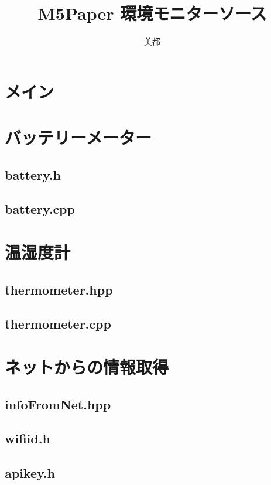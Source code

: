 \documentclass[a4paper, 10pt]{ltjsarticle}
\title{M5Paper 環境モニターソース}
\author{美都}
\begin{document}
\maketitle
\tableofcontents
\clearpage

\section {メイン}

\clearpage
\section {バッテリーメーター}
\subsection {battery.h}

\subsection {battery.cpp}

\clearpage

\section{温湿度計}
\subsection{thermometer.hpp}

\subsection{thermometer.cpp}

\clearpage

\section{ネットからの情報取得}
\subsection{infoFromNet.hpp}

\subsection{wifiid.h}

\subsection{apikey.h}

\end{document}
